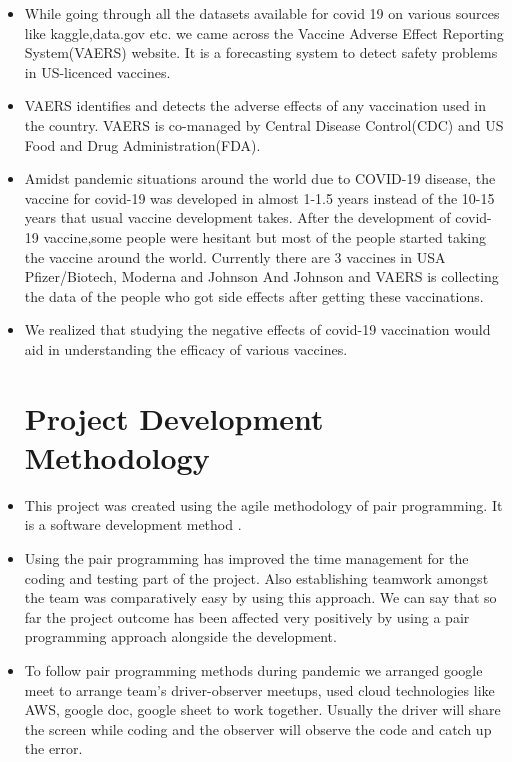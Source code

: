 \documentclass[conference]{IEEEtran}
\begin{document}
\begin{itemize}
\item While going through all the datasets available for covid 19 on various sources like kaggle,data.gov etc. we came across the Vaccine Adverse Effect Reporting System(VAERS) website. It is a forecasting system to detect safety problems in US-licenced vaccines.\\

\item VAERS identifies and detects the adverse effects of any vaccination used in the country. VAERS is co-managed by Central Disease Control(CDC) and US Food and Drug Administration(FDA).\\



\item Amidst pandemic situations around the world due to COVID-19 disease, the vaccine for covid-19 was developed in almost 1-1.5 years instead of the 10-15 years that usual vaccine development takes. After the development of covid-19 vaccine,some people were hesitant but most of the people started taking the vaccine around the world. Currently there are 3 vaccines in USA Pfizer/Biotech, Moderna and Johnson And Johnson and VAERS is collecting the data of the people who got side effects after getting these vaccinations.\\

\item We realized that studying the negative effects of covid-19 vaccination would aid in understanding the efficacy of various vaccines.\\

\section{Project Development Methodology
}

\item This project was created using the agile methodology of pair programming. It is a software development method . 

\item Using the pair programming has improved the time management for the coding and testing part of the project. Also establishing teamwork amongst the team was comparatively easy by using this approach. We can say that so far the project outcome has been affected very positively by using a pair programming approach alongside the development.
\item To follow pair programming methods during pandemic we arranged google meet to arrange team’s driver-observer meetups, used cloud technologies like AWS, google doc, google sheet to work together. Usually the driver will share the screen while coding and the observer will observe the code and catch up the error.



\end{itemize}
\end{document}
